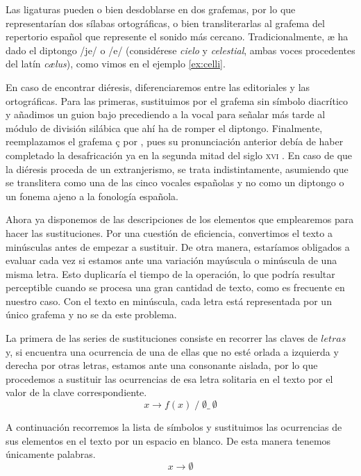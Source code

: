 Las ligaturas pueden o bien desdoblarse en dos grafemas, por lo que representarían dos sílabas ortográficas, o bien transliterarlas al grafema del repertorio español que represente el sonido más cercano. Tradicionalmente, \textlangle{}æ\textrangle{} ha dado el diptongo /je/ o /e/ (considérese \textit{cielo} y \textit{celestial}, ambas voces procedentes del latín \textit{cælus}), como vimos en el ejemplo \ref{ex:celli}.

En caso de encontrar diéresis, diferenciaremos entre las editoriales y las ortográficas. Para las primeras, sustituimos por el grafema sin símbolo diacrítico y añadimos un guion bajo precediendo a la vocal para señalar más tarde al módulo de división silábica que ahí ha de romper el diptongo. Finalmente, reemplazamos el grafema \textlangle{}ç\textrangle{} por , pues su pronunciación anterior  debía de haber completado la desafricación ya en la segunda mitad del siglo \textsc{xvi} \parencite[92.4]{lapesa2008}. En caso de que la diéresis proceda de un extranjerismo, se trata indistintamente, asumiendo que se translitera como una de las cinco vocales españolas y no como un diptongo o un fonema ajeno a la fonología española.

Ahora ya disponemos de las descripciones de los elementos que emplearemos para hacer las sustituciones. Por una cuestión de eficiencia, convertimos el texto a minúsculas antes de empezar a sustituir. De otra manera, estaríamos obligados a evaluar cada vez si estamos ante una variación mayúscula o minúscula de una misma letra. Esto duplicaría el tiempo de la operación, lo que podría resultar perceptible cuando se procesa una gran cantidad de texto, como es frecuente en nuestro caso. Con el texto en minúscula, cada letra está representada por un único grafema y no se da este problema.

La primera de las series de sustituciones consiste en recorrer las claves de $letras$ y, si encuentra una ocurrencia de una de ellas que no esté orlada a izquierda y derecha por otras letras, estamos ante una consonante aislada, por lo que procedemos a sustituir las ocurrencias de esa letra solitaria en el texto por el valor de la clave correspondiente.
\[x \longrightarrow f(x)\;/\; \emptyset \_\ \emptyset\]

A continuación recorremos la lista de símbolos y sustituimos las ocurrencias  de sus elementos en el texto por un espacio en blanco. De esta manera tenemos únicamente palabras.
\[x \longrightarrow \emptyset\]



